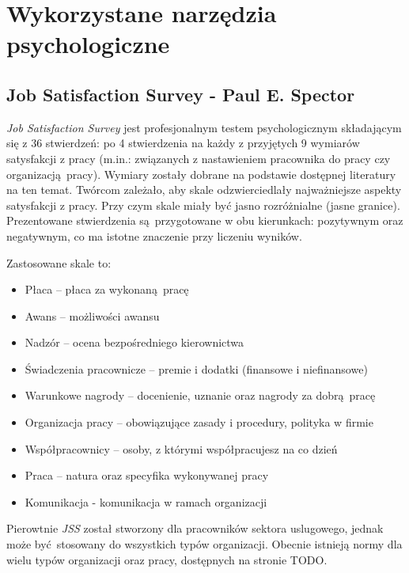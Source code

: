\section{Wykorzystane narzędzia psychologiczne}
\subsection{Job Satisfaction Survey - Paul E. Spector}
\emph{Job Satisfaction Survey} jest profesjonalnym testem psychologicznym składającym się z 36 stwierdzeń: po 4 stwierdzenia na każdy z przyjętych 9 wymiarów satysfakcji z pracy (m.in.: związanych z nastawieniem pracownika do pracy czy organizacją pracy). Wymiary zostały dobrane na podstawie dostępnej literatury na ten temat. Twórcom zależało, aby skale odzwierciedlały najważniejsze aspekty satysfakcji z pracy. Przy czym skale miały być jasno
rozróżnialne (jasne granice). Prezentowane stwierdzenia są przygotowane w obu kierunkach: pozytywnym oraz negatywnym, co ma istotne znaczenie przy liczeniu wyników. 

Zastosowane skale to:
\begin{itemize}
\item Płaca -- płaca za wykonaną pracę
\item Awans -- możliwości awansu
\item Nadzór -- ocena bezpośredniego kierownictwa
\item Świadczenia pracownicze -- premie i dodatki (finansowe i niefinansowe)
\item Warunkowe nagrody -- docenienie, uznanie oraz nagrody za dobrą pracę
\item Organizacja pracy -- obowiązujące zasady i procedury, polityka w firmie
\item Współpracownicy -- osoby, z którymi współpracujesz na co dzień
\item Praca -- natura oraz specyfika wykonywanej pracy
\item Komunikacja - komunikacja w ramach organizacji
\end{itemize}

Pierowtnie \emph{JSS} został stworzony dla pracowników sektora uslugowego, jednak może być stosowany do wszystkich typów organizacji. Obecnie istnieją normy dla wielu typów organizacji oraz pracy, dostępnych na stronie TODO.

